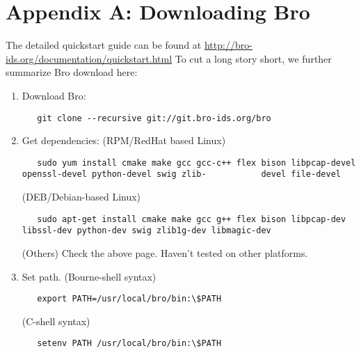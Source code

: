 \documentclass[acmtocl]{acmtrans2m}
\begin{document}
\section{Appendix A: Downloading Bro}
The detailed quickstart guide can be found at 
\url{http://bro-ids.org/documentation/quickstart.html}
To cut a long story short, we further summarize Bro download here:
\begin{enumerate}
\item Download Bro: 
\begin{verbatim}
   git clone --recursive git://git.bro-ids.org/bro
\end{verbatim}

\item Get dependencies:
   (RPM/RedHat based Linux)
   \begin{verbatim}
   sudo yum install cmake make gcc gcc-c++ flex bison libpcap-devel openssl-devel python-devel swig zlib-        	devel file-devel
   \end{verbatim}
   
   (DEB/Debian-based Linux)
   \begin{verbatim}
   sudo apt-get install cmake make gcc g++ flex bison libpcap-dev libssl-dev python-dev swig zlib1g-dev libmagic-dev
   \end{verbatim}

   (Others)
   Check the above page. Haven't tested on other platforms.
\item Set path.
   (Bourne-shell syntax)
   \begin{verbatim}
   export PATH=/usr/local/bro/bin:\$PATH 
   \end{verbatim}
  
   (C-shell syntax) 
   \begin{verbatim}
   setenv PATH /usr/local/bro/bin:\$PATH
   \end{verbatim}
\appendix

\end{enumerate}



\end{document}
